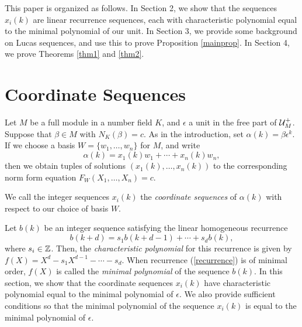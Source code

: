 \documentclass[11pt]{amsart}
\begin{document}
This paper is organized as follows. In Section 2, we show that the sequences $x_i(k)$ are linear recurrence sequences, each with characteristic polynomial equal to the minimal polynomial of our unit. In Section 3, we provide some background on Lucas sequences, and use this to prove Proposition \ref{mainprop}. In Section 4, we prove Theorems \ref{thm1} and \ref{thm2}.



\section{Coordinate Sequences}
Let $M$ be a full module in a number field $K$, and $\epsilon$ a unit in the free part of $\mathcal{U}_M^+$. Suppose that $\beta \in M$ with $N_K(\beta)=c$. As in the introduction, set $\alpha(k)=\beta \epsilon^k$. If we choose a basis $W=\{w_1, \dots, w_n\}$ for $M$, and write
\[\alpha(k)=x_1(k)w_1+\cdots+x_n(k)w_n,\]
then we obtain tuples of solutions $(x_1(k), \dots, x_n(k))$ to the corresponding norm form equation $F_W(X_1, \dots, X_n)=c$. 

\begin{mydef} We call the integer sequences $x_i(k)$ the \textit{coordinate sequences} of $\alpha(k)$ with respect to our choice of basis $W$. 
\end{mydef}

Let $b(k)$ be an integer sequence satisfying the linear homogeneous recurrence
\begin{equation} \label{recurrence} b(k+d)=s_1b(k+d-1)+\cdots+s_db(k), \end{equation}
where $s_i \in \mathbb{Z}$. Then, the \textit{characteristic polynomial} for this recurrence is given by $f(X)=X^d-s_1X^{d-1}-\cdots-s_d.$ 
When recurrence (\ref{recurrence}) is of minimal order, $f(X)$ is called the \textit{minimal polynomial} of the sequence $b(k)$. In this section, we show that the coordinate sequences $x_i(k)$ have characteristic polynomial equal to the minimal polynomial of $\epsilon$. We also provide sufficient conditions so that the minimal polynomial of the sequence $x_i(k)$ is equal to the minimal polynomial of $\epsilon$. 
\end{document}

